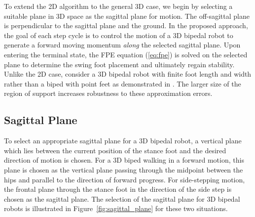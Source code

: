 To extend the 2D algorithm to the general 3D case, we begin by selecting a suitable plane in 3D space as the sagittal plane for motion. The off-sagittal plane is perpendicular to the sagittal plane and the ground.  In the proposed approach, the goal of each step cycle is to control the motion of a 3D bipedal robot to generate a forward moving momentum \emph{along} the selected sagittal plane. Upon entering the terminal state, the FPE equation (\ref{eq:fpe}) is solved on the selected plane to determine the swing foot placement and ultimately regain stability. Unlike the 2D case, consider a 3D bipedal robot with finite foot length and width rather than a biped with point feet as demonstrated in \cite{Wight:2008vt}. The larger size of the region of support increases robustness to these approximation errors. 

\subsection{Sagittal Plane} %
\label{sub:sagittal_plane}
To select an appropriate sagittal plane for a 3D bipedal robot, a vertical plane which lies between the current position of the stance foot and the desired direction of motion is chosen. For a 3D biped walking in a forward motion, this plane is chosen as the vertical plane passing through the midpoint between the hips and parallel to the direction of forward progress. For side-stepping motion, the frontal plane through the stance foot in the direction of the side step is chosen as the sagittal plane. The selection of the sagittal plane for 3D bipedal robots is illustrated in Figure~\ref{fig:sagittal_plane} for these two situations. 

